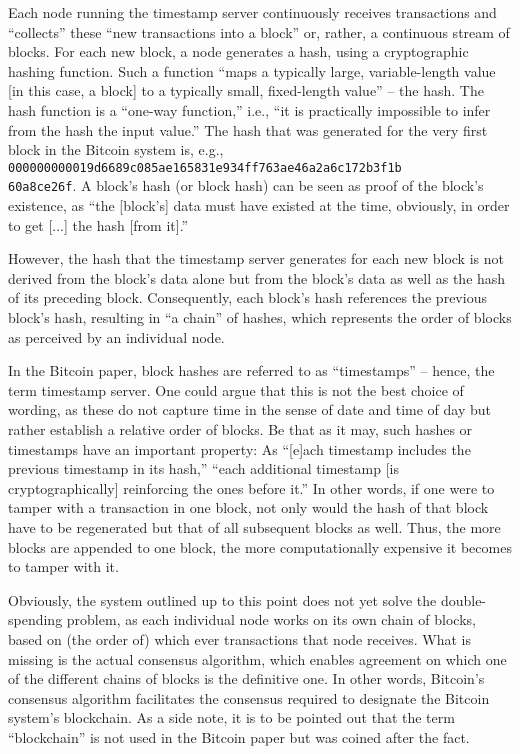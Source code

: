 Each node running the timestamp server continuously receives transactions and ``collects'' these ``new transactions into a block'' or, rather, a continuous stream of blocks. \autocite[3]{nakamoto2008}
For each new block, a node generates a hash, using a cryptographic hashing function.
Such a function ``maps a typically large, variable-length value [in this case, a block] to a typically small, fixed-length value'' -- the hash. \autocite[6]{baerenfaenger2020a}
The hash function is a ``one-way function,'' i.e., ``it is practically impossible to infer from the hash the input value.'' \autocite[6]{baerenfaenger2020a}
The hash that was generated for the very first block in the Bitcoin system is, e.g., \texttt{000000000019d6689c085ae165831e934ff763ae46a2a6c172b3f1b \\ 60a8ce26f}. \autocite{blockchaincom2020}
A block's hash (or block hash) can be seen as proof of the block's existence, as ``the [block's] data must have existed at the time, obviously, in order to get [...] the hash [from it].'' \autocite[2]{nakamoto2008}

However, the hash that the timestamp server generates for each new block is not derived from the block's data alone but from the block's data as well as the hash of its preceding block.
Consequently, each block's hash references the previous block's hash, resulting in ``a chain'' \autocite[2]{nakamoto2008} of hashes, which represents the order of blocks as perceived by an individual node.

In the Bitcoin paper, block hashes are referred to as ``timestamps'' \autocite{nakamoto2008} -- hence, the term timestamp server.
One could argue that this is not the best choice of wording, as these do not capture time in the sense of date and time of day but rather establish a relative order of blocks.
Be that as it may, such hashes or timestamps have an important property:
As ``[e]ach timestamp includes the previous timestamp in its hash,'' ``each additional timestamp [is cryptographically] reinforcing the ones before it.'' \autocite[2]{nakamoto2008}
In other words, if one were to tamper with a transaction in one block, not only would the hash of that block have to be regenerated but that of all subsequent blocks as well.
Thus, the more blocks are appended to one block, the more computationally expensive it becomes to tamper with it.

Obviously, the system outlined up to this point does not yet solve the double-spending problem, as each individual node works on its own chain of blocks, based on (the order of) which ever transactions that node receives.
What is missing is the actual consensus algorithm, which enables agreement on which one of the different chains of blocks is the definitive one.
In other words, Bitcoin's consensus algorithm facilitates the consensus required to designate the Bitcoin system's blockchain.
As a side note, it is to be pointed out that the term ``blockchain'' is not used in the Bitcoin paper but was coined after the fact.

